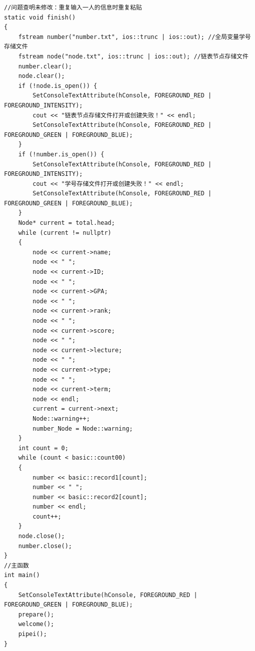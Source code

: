 \documentclass[fontset=windows]{article}
\begin{document}
\begin{lstlisting}[style = {cppstyle}]
//问题查明未修改：重复输入一人的信息时重复粘贴
static void finish()
{
	fstream number("number.txt", ios::trunc | ios::out); //全局变量学号存储文件
	fstream node("node.txt", ios::trunc | ios::out); //链表节点存储文件
	number.clear();
	node.clear();
	if (!node.is_open()) {
		SetConsoleTextAttribute(hConsole, FOREGROUND_RED | FOREGROUND_INTENSITY);
		cout << "链表节点存储文件打开或创建失败！" << endl;
		SetConsoleTextAttribute(hConsole, FOREGROUND_RED | FOREGROUND_GREEN | FOREGROUND_BLUE);
	}
	if (!number.is_open()) {
		SetConsoleTextAttribute(hConsole, FOREGROUND_RED | FOREGROUND_INTENSITY);
		cout << "学号存储文件打开或创建失败！" << endl;
		SetConsoleTextAttribute(hConsole, FOREGROUND_RED | FOREGROUND_GREEN | FOREGROUND_BLUE);
	}
	Node* current = total.head;
	while (current != nullptr)
	{
		node << current->name;
		node << " ";
		node << current->ID;
		node << " ";
		node << current->GPA;
		node << " ";
		node << current->rank;
		node << " ";
		node << current->score;
		node << " ";
		node << current->lecture;
		node << " ";
		node << current->type;
		node << " ";
		node << current->term;
		node << endl;
		current = current->next;
		Node::warning++;
		number_Node = Node::warning;
	}
	int count = 0;
	while (count < basic::count00)
	{
		number << basic::record1[count];
		number << " ";
		number << basic::record2[count];
		number << endl;
		count++;
	}
	node.close();
	number.close();
}
//主函数
int main()
{
	SetConsoleTextAttribute(hConsole, FOREGROUND_RED | FOREGROUND_GREEN | FOREGROUND_BLUE);
	prepare();
	welcome();
	pipei();
}


	\end{lstlisting}
\end{document}

